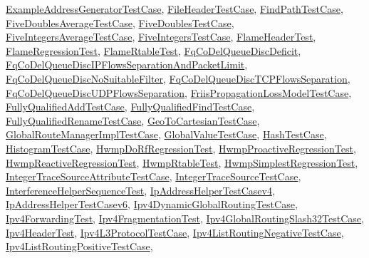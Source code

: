 \hyperlink{classExampleAddressGeneratorTestCase}{Example\+Address\+Generator\+Test\+Case}, \hyperlink{classFileHeaderTestCase}{File\+Header\+Test\+Case}, \hyperlink{classFindPathTestCase}{Find\+Path\+Test\+Case}, \hyperlink{classFiveDoublesAverageTestCase}{Five\+Doubles\+Average\+Test\+Case}, \hyperlink{classFiveDoublesTestCase}{Five\+Doubles\+Test\+Case}, \hyperlink{classFiveIntegersAverageTestCase}{Five\+Integers\+Average\+Test\+Case}, \hyperlink{classFiveIntegersTestCase}{Five\+Integers\+Test\+Case}, \hyperlink{structFlameHeaderTest}{Flame\+Header\+Test}, \hyperlink{classFlameRegressionTest}{Flame\+Regression\+Test}, \hyperlink{classFlameRtableTest}{Flame\+Rtable\+Test}, \hyperlink{classFqCoDelQueueDiscDeficit}{Fq\+Co\+Del\+Queue\+Disc\+Deficit}, \hyperlink{classFqCoDelQueueDiscIPFlowsSeparationAndPacketLimit}{Fq\+Co\+Del\+Queue\+Disc\+I\+P\+Flows\+Separation\+And\+Packet\+Limit}, \hyperlink{classFqCoDelQueueDiscNoSuitableFilter}{Fq\+Co\+Del\+Queue\+Disc\+No\+Suitable\+Filter}, \hyperlink{classFqCoDelQueueDiscTCPFlowsSeparation}{Fq\+Co\+Del\+Queue\+Disc\+T\+C\+P\+Flows\+Separation}, \hyperlink{classFqCoDelQueueDiscUDPFlowsSeparation}{Fq\+Co\+Del\+Queue\+Disc\+U\+D\+P\+Flows\+Separation}, \hyperlink{classFriisPropagationLossModelTestCase}{Friis\+Propagation\+Loss\+Model\+Test\+Case}, \hyperlink{classFullyQualifiedAddTestCase}{Fully\+Qualified\+Add\+Test\+Case}, \hyperlink{classFullyQualifiedFindTestCase}{Fully\+Qualified\+Find\+Test\+Case}, \hyperlink{classFullyQualifiedRenameTestCase}{Fully\+Qualified\+Rename\+Test\+Case}, \hyperlink{classGeoToCartesianTestCase}{Geo\+To\+Cartesian\+Test\+Case}, \hyperlink{classGlobalRouteManagerImplTestCase}{Global\+Route\+Manager\+Impl\+Test\+Case}, \hyperlink{classGlobalValueTestCase}{Global\+Value\+Test\+Case}, \hyperlink{classHashTestCase}{Hash\+Test\+Case}, \hyperlink{classHistogramTestCase}{Histogram\+Test\+Case}, \hyperlink{classHwmpDoRfRegressionTest}{Hwmp\+Do\+Rf\+Regression\+Test}, \hyperlink{classHwmpProactiveRegressionTest}{Hwmp\+Proactive\+Regression\+Test}, \hyperlink{classHwmpReactiveRegressionTest}{Hwmp\+Reactive\+Regression\+Test}, \hyperlink{classHwmpRtableTest}{Hwmp\+Rtable\+Test}, \hyperlink{classHwmpSimplestRegressionTest}{Hwmp\+Simplest\+Regression\+Test}, \hyperlink{classIntegerTraceSourceAttributeTestCase}{Integer\+Trace\+Source\+Attribute\+Test\+Case}, \hyperlink{classIntegerTraceSourceTestCase}{Integer\+Trace\+Source\+Test\+Case}, \hyperlink{classInterferenceHelperSequenceTest}{Interference\+Helper\+Sequence\+Test}, \hyperlink{classIpAddressHelperTestCasev4}{Ip\+Address\+Helper\+Test\+Casev4}, \hyperlink{classIpAddressHelperTestCasev6}{Ip\+Address\+Helper\+Test\+Casev6}, \hyperlink{classIpv4DynamicGlobalRoutingTestCase}{Ipv4\+Dynamic\+Global\+Routing\+Test\+Case}, \hyperlink{classIpv4ForwardingTest}{Ipv4\+Forwarding\+Test}, \hyperlink{classIpv4FragmentationTest}{Ipv4\+Fragmentation\+Test}, \hyperlink{classIpv4GlobalRoutingSlash32TestCase}{Ipv4\+Global\+Routing\+Slash32\+Test\+Case}, \hyperlink{classIpv4HeaderTest}{Ipv4\+Header\+Test}, \hyperlink{classIpv4L3ProtocolTestCase}{Ipv4\+L3\+Protocol\+Test\+Case}, \hyperlink{classIpv4ListRoutingNegativeTestCase}{Ipv4\+List\+Routing\+Negative\+Test\+Case}, \hyperlink{classIpv4ListRoutingPositiveTestCase}{Ipv4\+List\+Routing\+Positive\+Test\+Case}, 